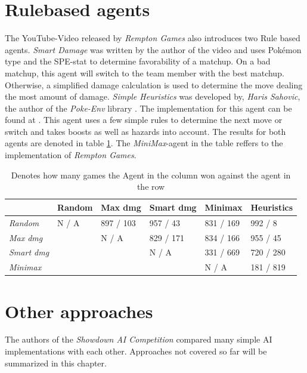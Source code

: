 \section{Rulebased agents}
\label{sec:related-rulebased}
The YouTube-Video released by \emph{Rempton Games} \cite{RemptonGames:PokemonAI} also introduces two Rule based agents.
\textit{Smart Damage} was written by the author of the video and uses Pokémon type and the \ac{SPE}-stat to determine
favorability of a matchup. On a bad matchup, this agent will switch to the team member with the best matchup. Otherwise,
a simplified damage calculation is used to determine the move dealing the most amount of damage. \textit{Simple 
Heuristics} was developed by, \emph{Haris Sahovic}, the author of the \emph{Poke-Env} library \cite{PokeEnv:Github}.
The implementation for this agent can be found at \cite{PokeEnv:Baselines}. This agent uses a few simple rules
to determine the next move or switch and takes boosts as well as hazards into account. The results for both agents
are denoted in table \ref{tbl:Youtube-Results}. The \emph{MiniMax}-agent in the table reffers to the implementation
of \emph{Rempton Games}.
\begin{table}[h]
    \centering
        \begin{tabular}{|l|l|l|l|l|l|}
            \hline
            & Random & Max dmg & Smart dmg & Minimax & Heuristics \\
            \hline
            \emph{Random} & N / A & 897 / 103 & 957 / 43 & 831 / 169 & 992 / 8 \\
            \hline
            \emph{Max dmg} & & N / A & 829 / 171 & 834 / 166 & 955 / 45 \\
            \hline
            \emph{Smart dmg} & & & N / A & 331 / 669 & 720 / 280 \\
            \hline
            \emph{Minimax} & & & & N / A & 181 / 819 \\
            \hline 
        \end{tabular}
        \caption{Denotes how many games the Agent in the column won against the agent in the row \cite{RemptonGames:PokemonAI}}
        \label{tbl:Youtube-Results}
\end{table}

\section{Other approaches}
The authors of the \textit{Showdown AI Competition}\cite{Lee_Togelius_2017} compared many
simple AI implementations with each other. Approaches not covered so far will be summarized
in this chapter.


